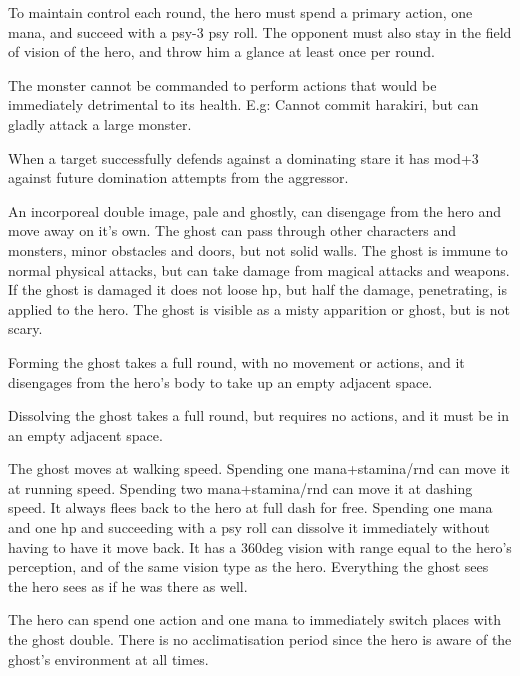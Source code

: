 To maintain control each round, the hero must spend a primary action, one mana, and succeed with a psy-3 \vs psy roll. The opponent must also stay in the field of vision of the hero, and throw him a glance at least once per round.

The monster cannot be commanded to perform actions that would be immediately detrimental to its health. E.g: Cannot commit harakiri, but can gladly attack a large monster.

When a target successfully defends against a dominating stare it has mod+3 against future domination attempts from the aggressor.


 An incorporeal double image, pale and ghostly, can disengage from the hero and move away on it's own. The ghost can pass through other characters and monsters, minor obstacles and doors, but not solid walls. The ghost is immune to normal physical attacks, but can take damage from magical attacks and weapons. If the ghost is damaged it does not loose hp, but half the damage, penetrating, is applied to the hero. The ghost is visible as a misty apparition or ghost, but is not scary.

Forming the ghost takes a full round, with no movement or actions, and it disengages from the hero's body to take up an empty adjacent space.

Dissolving the ghost takes a full round, but requires no actions, and it must be in an empty adjacent space.

The ghost moves at walking speed. Spending one mana+stamina/rnd can move it at running speed. Spending two mana+stamina/rnd can move it at dashing speed. It always flees back to the hero at full dash for free. Spending one mana and one hp and succeeding with a psy roll can dissolve it immediately without having to have it move back.
It has a 360deg vision with range equal to the hero's perception, and of the same vision type as the hero. Everything the ghost sees the hero sees as if he was there as well.

The hero can spend one action and one mana to immediately switch places with the ghost double. There is no acclimatisation period since the hero is aware of the ghost's environment at all times.


